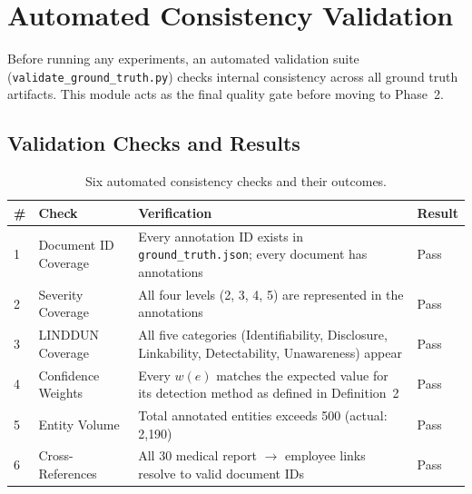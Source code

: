 \documentclass[12pt, a4paper]{report}
\begin{document}
\newpage
\section{Automated Consistency Validation}
\label{sec:validation}

Before running any experiments, an automated validation suite (\texttt{validate\_ground\_truth.py}) checks internal consistency across all ground truth artifacts. This module acts as the final quality gate before moving to Phase~2.

\subsection{Validation Checks and Results}

\begin{table}[H]
\centering
\caption{Six automated consistency checks and their outcomes.}
\label{tab:validation}
\small
{}
\begin{tabular}{C{0.7cm} L{3.8cm} L{6.8cm} C{1.5cm}}
\toprule
{}
\color{white}\textbf{\#} &
\color{white}\textbf{Check} &
\color{white}\textbf{Verification} &
\color{white}\textbf{Result} \\
 & Document ID Coverage    & Every annotation ID exists in \texttt{ground\_truth.json}; every document has annotations & Pass \\
2 & Severity Coverage       & All four levels (2, 3, 4, 5) are represented in the annotations & Pass \\
3 & LINDDUN Coverage        & All five categories (Identifiability, Disclosure, Linkability, Detectability, Unawareness) appear & Pass \\
4 & Confidence Weights      & Every $w(e)$ matches the expected value for its detection method as defined in Definition~2 & Pass \\
5 & Entity Volume           & Total annotated entities exceeds 500 (actual: 2{,}190) & Pass \\
6 & Cross-References        & All 30 medical report $\to$ employee links resolve to valid document IDs & Pass \\
\bottomrule
\end{tabular}
\end{table}
\end{document}
